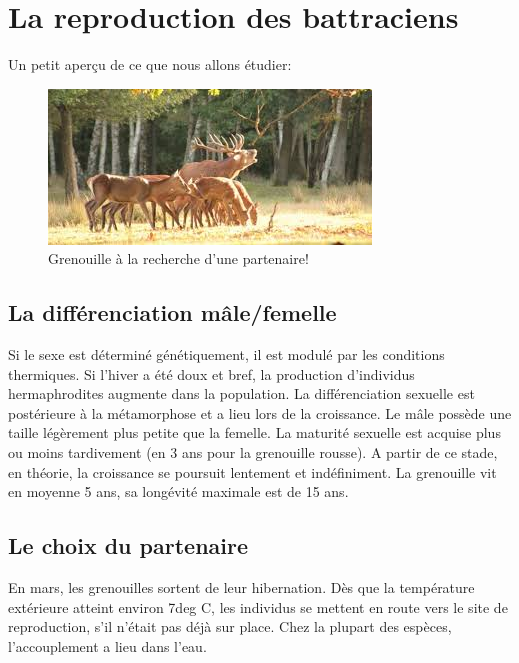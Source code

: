 \section{La reproduction des battraciens}

Un petit aperçu de ce que nous allons étudier:

\begin{figure}
	\begin{center}

	\includegraphics[width=.9\textwidth]{laRepro/CycleRepro.jpg}	
	\end{center}
	\caption{Grenouille à la recherche d'une partenaire!}%
	\label{fig:brameCerf}
\end{figure}

\subsection{La différenciation mâle/femelle}

Si le sexe est déterminé génétiquement, il est modulé par les conditions thermiques. 
Si l’hiver a été doux et bref, la production d’individus hermaphrodites augmente dans la population.
La différenciation sexuelle est postérieure à la métamorphose et a lieu lors de la croissance.
Le mâle possède une taille légèrement plus petite que la femelle.
La maturité sexuelle est acquise plus ou moins tardivement (en 3 ans pour la grenouille rousse). 
A partir de ce stade, en théorie, la croissance se poursuit lentement et indéfiniment. La grenouille vit en moyenne 5 ans, sa longévité maximale est de 15 ans.
        
\subsection{Le choix du partenaire}

En mars, les grenouilles sortent de leur hibernation.  
Dès que la température extérieure atteint environ 7deg C, les individus se mettent en route vers le site de reproduction, s’il n’était pas déjà sur place. 
Chez la plupart des espèces, l’accouplement a lieu dans l’eau.

